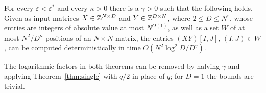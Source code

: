 \begin{theorem}\label{thm:general}
For every $\varepsilon<\varepsilon^*$ and every $\kappa>0$ there is a $\gamma>0$ such that the following holds. Given as input matrices $X\in\mathbb{Z}^{N\times D}$ and $Y\in\mathbb{Z}^{D\times N}$, where $2\le D\le N^{\varepsilon}$, whose entries are integers of absolute value at most $N^{O(1)}$, as well as a set $W$ of at most $N^2/D^{\kappa}$ positions of an $N\times N$ matrix, the entries $(XY)[I,J]$, $(I,J)\in W$, can be computed deterministically in time $O(N^2\log^2\!D/D^{\gamma})$.
\end{theorem}

The logarithmic factors in both theorems can be removed by halving $\gamma$ and applying Theorem~\ref{thm:single} with $q/2$ in place of $q$; for $D=1$ the bounds are trivial.

